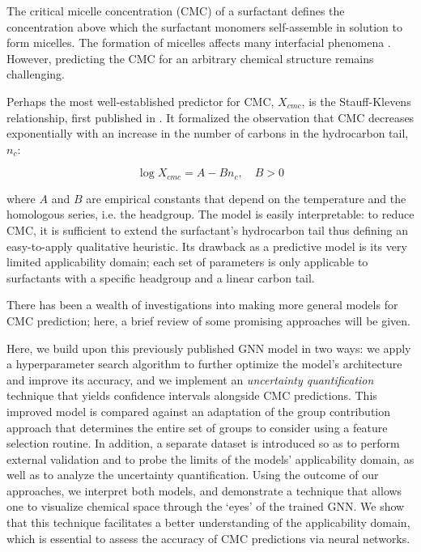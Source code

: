The critical micelle concentration (CMC) of a surfactant defines the
concentration above which the surfactant monomers self-assemble in solution to
form micelles. The formation of micelles affects many interfacial phenomena
\cite{rosenSurfactantsInterfacialPhenomena2012}. However, predicting the CMC for
an arbitrary chemical structure remains challenging.

Perhaps the most well-established predictor for CMC, $X_{cmc}$, is the
Stauff-Klevens relationship, first published in
\citeyear{klevensStructureAggregationDilate1953}
\cite{klevensStructureAggregationDilate1953}. It formalized the observation that
CMC decreases exponentially with an increase in the number of carbons in the
hydrocarbon tail, $n_c$:

\begin{equation}
    \label{eq:klevens}
    \log X_{cmc} = A - Bn_c, \quad B > 0
\end{equation}

where $A$ and $B$ are empirical constants that depend on the temperature and the
homologous series, i.e. the headgroup. The model is easily interpretable: to
reduce CMC, it is sufficient to extend the surfactant's hydrocarbon tail thus
defining an easy-to-apply qualitative heuristic. Its drawback as a predictive
model is its very limited applicability domain; each set of parameters is only
applicable to surfactants with a specific headgroup and a linear carbon tail.

There has been a wealth of investigations into making more general models for
CMC prediction; here, a brief review of some promising approaches will be given.



Here, we build upon this previously published GNN model
\cite{qinPredictingCriticalMicelle2021} in two ways: we apply a hyperparameter
search algorithm to further optimize the model's architecture and improve its
accuracy, and we implement an \emph{uncertainty quantification} technique that
yields confidence intervals alongside CMC predictions. This improved model is
compared against an adaptation of the group contribution approach that
determines the entire set of groups to consider using a feature selection
routine. In addition, a separate dataset is introduced so as to perform external
validation and to probe the limits of the models' applicability domain, as well
as to analyze the uncertainty quantification. Using the outcome of our
approaches, we interpret both models, and demonstrate a technique that allows
one to visualize chemical space through the `eyes' of the trained GNN. We show
that this technique facilitates a better understanding of the applicability
domain, which is essential to assess the accuracy of CMC predictions via neural
networks.